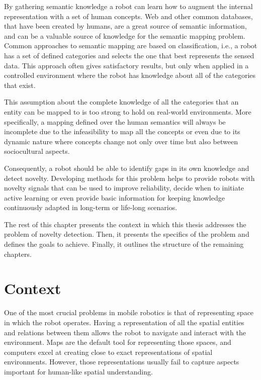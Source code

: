 By gathering semantic knowledge a robot can learn how to augment the internal representation with a
set of human concepts. Web and other common databases, that have been created by humans, are a
great source of semantic information, and can be a valuable source of knowledge for the semantic mapping
problem. Common approaches to semantic mapping are based on classification, i.e., a robot has a set of
defined categories and selects the one that best represents the sensed data. This approach often
gives satisfactory results, but only when applied in a controlled environment where the robot has
knowledge about all of the categories that exist.

This assumption about the complete knowledge of all the categories that an entity can be mapped to is 
too strong to hold on real-world environments. More specifically, a mapping defined over the human semantics 
will always be incomplete due to the infeasibility to map all the concepts or even due to its dynamic nature 
where concepts change not only over time but also between sociocultural aspects.

Consequently, a robot should be able to identify gaps in its own knowledge and detect novelty.
Developing methods for this problem helps to provide robots with novelty signals that can be
used to improve reliability, decide when to initiate active learning or even provide basic
information for keeping knowledge continuously adapted in long-term or life-long scenarios.

The rest of this chapter presents the context in which this thesis addresses the problem of novelty detection.
Then, it presents the specifics of the problem and defines the goals to achieve. Finally, it outlines the 
structure of the remaining chapters.


\section{Context}

%
One of the most crucial problems in mobile robotics is that of representing space in which the robot operates. 
Having a representation of all the spatial entities and relations between them allows the robot to navigate and 
interact with the environment. Maps are the default tool for representing those spaces, and computers excel at
creating close to exact representations of spatial environments. However, those representations usually fail to
capture aspects important for human-like spatial understanding.

